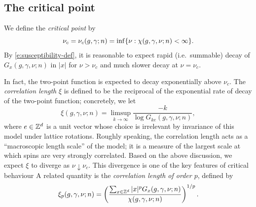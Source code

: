 \subsection{The critical point}

We define the \emph{critical point} by
\begin{equation}
\nu_c = \nu_c(g, \gamma; n) = \inf \{ \nu : \chi(g, \gamma, \nu; n) < \infty \}.
\end{equation}
By \eqref{e:susceptibility-def}, it is
reasonable to expect rapid (i.e.\ summable) decay of $G_x(g, \gamma, \nu; n)$ in $|x|$ for
$\nu > \nu_c$ and much slower decay at $\nu = \nu_c$.

In fact, the two-point function is expected to decay exponentially above $\nu_c$.
The \emph{correlation length} $\xi$ is defined to be the reciprocal of the exponential
rate of decay of the two-point function; concretely, we let
\begin{equation}
\label{e:cl-spins}
\xi(g, \gamma, \nu; n) = \limsup_{k\to\infty} \frac{-k}{\log G_{ke}(g, \gamma, \nu; n)},
\end{equation}
where $e \in { {{\mathbb Z}}^d }$ is a unit vector whose choice is irrelevant by invariance of this model
under lattice rotations.
Roughly speaking, the correlation length acts as
a ``macroscopic length scale'' of the model; it is a measure of the largest scale at
which spins are very strongly correlated. Based on the above discussion, we expect $\xi$
to diverge as $\nu\downarrow\nu_c$. This divergence is one of the
key features of critical behaviour
A related quantity is the \emph{correlation length of order $p$}, defined by
\begin{equation}
\label{e:clp-spins}
\xi_p(g, \gamma, \nu; n)
	=
\left(\frac{\sum_{x\in{ {{\mathbb Z}}^d }} |x|^p G_x(g, \gamma, \nu; n)}{\chi(g, \gamma, \nu; n)}\right)^{1/p}.
\end{equation}

